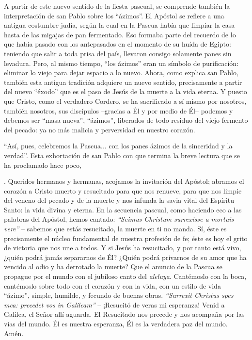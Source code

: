 			\begin{body}A partir de este nuevo sentido de la fiesta pascual, se comprende también la interpretación de san Pablo sobre los “ázimos”. El Apóstol se refiere a una antigua costumbre judía, según la cual en la Pascua había que limpiar la casa hasta de las migajas de pan fermentado. Eso formaba parte del recuerdo de lo que había pasado con los antepasados en el momento de su huída de Egipto: teniendo que salir a toda prisa del país, llevaron consigo solamente panes sin levadura. Pero, al mismo tiempo, “los ázimos” eran un símbolo de purificación: eliminar lo viejo para dejar espacio a lo nuevo. Ahora, como explica san Pablo, también esta antigua tradición adquiere un nuevo sentido, precisamente a partir del nuevo “éxodo” que es el paso de Jesús de la muerte a la vida eterna. Y puesto que Cristo, como el verdadero Cordero, se ha sacrificado a sí mismo por nosotros, también nosotros, sus discípulos –gracias a Él y por medio de Él– podemos y debemos ser “masa nueva”, “ázimos”, liberados de todo residuo del viejo fermento del pecado: ya no más malicia y perversidad en nuestro corazón.\end{body}
			
			\begin{body}“Así, pues, celebremos la Pascua... con los panes ázimos de la sinceridad y la verdad”. Esta exhortación de san Pablo con que termina la breve lectura que se ha proclamado hace poco, \begin{bodysmall}\end{bodysmall}. Queridos hermanos y hermanas, acojamos la invitación del Apóstol; abramos el corazón a Cristo muerto y resucitado para que nos renueve, para que nos limpie del veneno del pecado y de la muerte y nos infunda la savia vital del Espíritu Santo: la vida divina y eterna. En la secuencia pascual, como haciendo eco a las palabras del Apóstol, hemos cantado: \textit{“Scimus Christum surrexisse a mortuis vere”} – sabemos que estás resucitado, la muerte en ti no manda. Sí, éste es precisamente el núcleo fundamental de nuestra profesión de fe; éste es hoy el grito de victoria que nos une a todos. Y si Jesús ha resucitado, y por tanto está vivo, ¿quién podrá jamás separarnos de Él? ¿Quién podrá privarnos de su amor que ha vencido al odio y ha derrotado la muerte? Que el anuncio de la Pascua se propague por el mundo con el jubiloso canto del \textit{aleluya}. Cantémoslo con la boca, cantémoslo sobre todo con el corazón y con la vida, con un estilo de vida “ázimo”, simple, humilde, y fecundo de buenas obras. \textit{“Surrexit Christus spes mea: precedet vos in Galileam”} – ¡Resucitó de veras mi esperanza! Venid a Galilea, el Señor allí aguarda. El Resucitado nos precede y nos acompaña por las vías del mundo. Él es nuestra esperanza, Él es la verdadera paz del mundo. Amén.\end{body}
			
